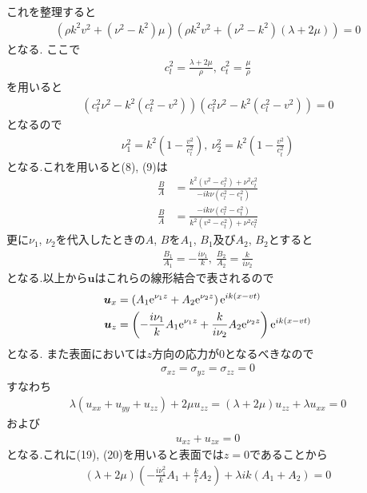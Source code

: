 \documentclass[uplatex,a4j,11pt,dvipdfmx]{jsarticle}
\begin{document}
これを整理すると
\begin{align}
  \left(\rho k^2v^2+(\nu^2-k^2)\mu\right)\left(\rho k^2v^2+(\nu^2-k^2)(\lambda+2\mu)\right)=0
\end{align}
となる.
ここで
\begin{align}
  c_l^2=\frac{\lambda+2\mu}{\rho},\ c_t^2=\frac{\mu}{\rho}
\end{align}
を用いると
\begin{align}
  \left(c_t^2\nu^2-k^2(c_t^2-v^2)\right)\left(c_l^2\nu^2-k^2(c_l^2-v^2)\right)=0
\end{align}
となるので
\begin{align}
  \nu_1^2=k^2\left(1-\frac{v^2}{c_l^2}\right),\ \nu_2^2=k^2\left(1-\frac{v^2}{c_t^2}\right)
\end{align}
となる.これを用いると(8), (9)は
\begin{align}
  \frac{B}{A}&=\frac{k^2(v^2-c_l^2)+\nu^2c_t^2}{-ik\nu(c_l^2-c_t^2)}
\end{align}
\begin{align}
  \frac{B}{A}&=\frac{-ik\nu(c_l^2-c_t^2)}{k^2(v^2-c_t^2)+\nu^2c_l^2}
\end{align}
更に$\nu_1$, $\nu_2$を代入したときの$A$, $B$を$A_1$, $B_1$及び$A_2$, $B_2$とすると
\begin{align}
  \frac{B_1}{A_1}=-\frac{i\nu_1}{k},\ \frac{B_2}{A_2}=\frac{k}{i\nu_2}
\end{align}
となる.以上から$\bm u$はこれらの線形結合で表されるので
\begin{align}
  {\bm u}_x&=\left(A_1{\rm e}^{\nu_1 z}+A_2{\rm e}^{\nu_2 z}\right){\rm e}^{ik(x-vt)}\\
  {\bm u}_z&=\left(-\frac{i\nu_1}{k}A_1{\rm e}^{\nu_1 z}+\frac{k}{i\nu_2}A_2{\rm e}^{\nu_2 z}\right){\rm e}^{ik(x-vt)}
\end{align}
となる.
また表面においては$z$方向の応力が0となるべきなので
\begin{align}
  \sigma_{xz}=\sigma_{yz}=\sigma_{zz}=0
\end{align}
すなわち
\begin{align}
  \lambda(u_{xx}+u_{yy}+u_{zz})+2\mu u_{zz}=(\lambda+2\mu)u_{zz}+\lambda u_{xx}=0
\end{align}
および
\begin{align}
  u_{xz}+u_{zx}=0
\end{align}
となる.これに(19), (20)を用いると表面では$z=0$であることから
\begin{align}
  (\lambda+2\mu)\left(-\frac{i\nu_1^2}{k}A_1+\frac{k}{i}A_2\right)+\lambda ik(A_1+A_2)=0
\end{align}
\end{document}
